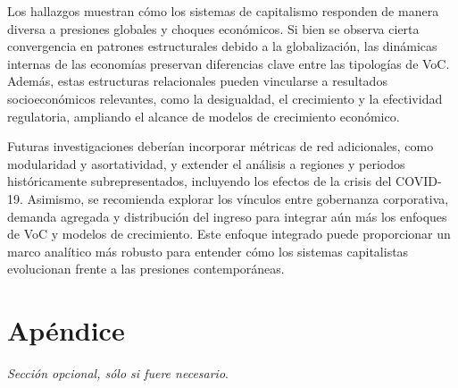 \documentclass[12pt]{article}
\begin{document}
Los hallazgos muestran cómo los sistemas de capitalismo responden de manera diversa a presiones globales y choques económicos. Si bien se observa cierta convergencia en patrones estructurales debido a la globalización, las dinámicas internas de las economías preservan diferencias clave entre las tipologías de VoC. Además, estas estructuras relacionales pueden vincularse a resultados socioeconómicos relevantes, como la desigualdad, el crecimiento y la efectividad regulatoria, ampliando el alcance de modelos de crecimiento económico.

Futuras investigaciones deberían incorporar métricas de red adicionales, como modularidad y asortatividad, y extender el análisis a regiones y periodos históricamente subrepresentados, incluyendo los efectos de la crisis del COVID-19. Asimismo, se recomienda explorar los vínculos entre gobernanza corporativa, demanda agregada y distribución del ingreso para integrar aún más los enfoques de VoC y modelos de crecimiento. Este enfoque integrado puede proporcionar un marco analítico más robusto para entender cómo los sistemas capitalistas evolucionan frente a las presiones contemporáneas.

%
\printbibliography
\newpage
\section{Apéndice}


\textit{Sección opcional, sólo si fuere necesario}.
\end{document}
